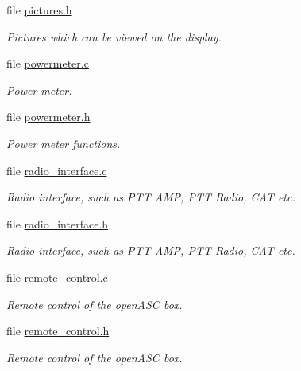 \begin{CompactItemize}
\item 
file \hyperlink{pictures_8h}{pictures.h}
\begin{CompactList}\small\item\em Pictures which can be viewed on the display. \item\end{CompactList}

\item 
file \hyperlink{powermeter_8c}{powermeter.c}
\begin{CompactList}\small\item\em Power meter. \item\end{CompactList}

\item 
file \hyperlink{powermeter_8h}{powermeter.h}
\begin{CompactList}\small\item\em Power meter functions. \item\end{CompactList}

\item 
file \hyperlink{radio__interface_8c}{radio\_\-interface.c}
\begin{CompactList}\small\item\em Radio interface, such as PTT AMP, PTT Radio, CAT etc. \item\end{CompactList}

\item 
file \hyperlink{radio__interface_8h}{radio\_\-interface.h}
\begin{CompactList}\small\item\em Radio interface, such as PTT AMP, PTT Radio, CAT etc. \item\end{CompactList}

\item 
file \hyperlink{remote__control_8c}{remote\_\-control.c}
\begin{CompactList}\small\item\em Remote control of the openASC box. \item\end{CompactList}

\item 
file \hyperlink{remote__control_8h}{remote\_\-control.h}
\begin{CompactList}\small\item\em Remote control of the openASC box. \item\end{CompactList}


\end{CompactItemize}
